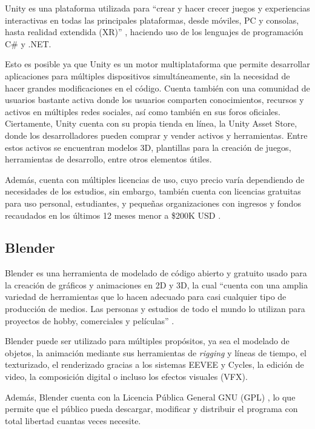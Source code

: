 Unity es una plataforma utilizada para “crear y hacer crecer juegos y experiencias interactivas en todas las principales plataformas, desde móviles, PC y consolas, hasta realidad extendida (XR)” \autocite{unityCompany}, haciendo uso de los lenguajes de programación C\# y .NET.

Esto es posible ya que Unity es un motor multiplataforma que permite desarrollar aplicaciones para múltiples dispositivos simultáneamente, sin la necesidad de hacer grandes modificaciones en el código. Cuenta también con una comunidad de usuarios bastante activa donde los usuarios comparten conocimientos, recursos y activos en múltiples redes sociales, así como también en sus foros oficiales. Ciertamente, Unity cuenta con su propia tienda en línea, la Unity Asset Store, donde los desarrolladores pueden comprar y vender activos y herramientas. Entre estos activos se encuentran modelos 3D, plantillas para la creación de juegos, herramientas de desarrollo, entre otros elementos útiles.

Además, cuenta con múltiples licencias de uso, cuyo precio varía dependiendo de necesidades de los estudios, sin embargo, también cuenta con licencias gratuitas para uso personal, estudiantes, y pequeñas organizaciones con ingresos y fondos recaudados en los últimos 12 meses menor a \$200K USD \autocite{unityPricing}.

\subsection{Blender}

Blender es una herramienta de modelado de código abierto y gratuito usado para la creación de gráficos y animaciones en 2D y 3D, la cual “cuenta con una amplia variedad de herramientas que lo hacen adecuado para casi cualquier tipo de producción de medios. Las personas y estudios de todo el mundo lo utilizan para proyectos de hobby, comerciales y películas” \autocite{blenderManual282}.

Blender puede ser utilizado para múltiples propósitos, ya sea el modelado de objetos, la animación mediante sus herramientas de \textit{rigging} y líneas de tiempo, el texturizado, el renderizado gracias a los sistemas EEVEE y Cycles, la edición de video, la composición digital o incluso los efectos visuales (VFX).

Además, Blender cuenta con la Licencia Pública General GNU (GPL) \autocite{blenderAbout}, lo que permite que el público pueda descargar, modificar y distribuir el programa con total libertad cuantas veces necesite.

